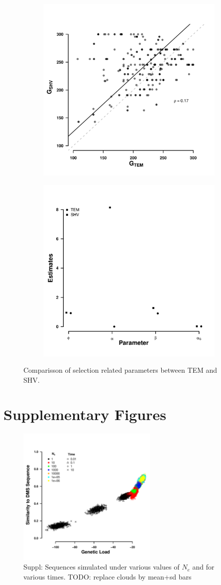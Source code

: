 \documentclass[12pt]{article}
\begin{document}
\begin{figure}[h]
    \centering
    \begin{subfigure}
        \centering
        \includegraphics[width=.45\textwidth]{img/g_shift_lac.pdf}
    \end{subfigure}
    \begin{subfigure}
        \centering
        \includegraphics[width=.45\textwidth]{img/TEM_SHV_2016_par_comp.pdf}
    \end{subfigure}
    \caption{Comparisson of selection related parameters between TEM and SHV.}
    \label{fig:tem_shv_param_comp}
\end{figure}


\beginsupplement
\section*{Supplementary Figures}

\begin{figure}[H]
     \centering
	\includegraphics[width=0.6\textwidth]{img/simulated_seqs_gl_dist.pdf}
	\caption{Suppl: Sequences simulated under various values of $N_e$ and for various times. TODO: replace clouds by mean+sd bars}
	\label{fig:sim_seqs}
\end{figure}
\end{document}
